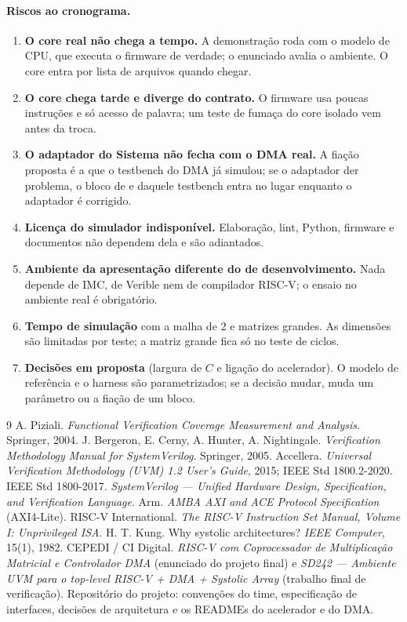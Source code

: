 \documentclass[10pt,a4paper]{article}
\newcommand{\code}[1]{\texttt{\detokenize{#1}}}
\begin{document}
\paragraph{Riscos ao cronograma.}
\begin{enumerate}[label=(\roman*),leftmargin=2.6em]
  \item \textbf{O core real não chega a tempo.} A demonstração roda com o modelo de CPU, que
  executa o firmware de verdade; o enunciado avalia o ambiente. O core entra por lista de arquivos
  quando chegar.
  \item \textbf{O core chega tarde e diverge do contrato.} O firmware usa poucas instruções e só
  acesso de palavra; um teste de fumaça do core isolado vem antes da troca.
  \item \textbf{O adaptador do Sistema não fecha com o DMA real.} A fiação proposta é a que o
  testbench do DMA já simulou; se o adaptador der problema, o bloco de \code{CTRL} e \code{STATUS}
  daquele testbench entra no lugar enquanto o adaptador é corrigido.
  \item \textbf{Licença do simulador indisponível.} Elaboração, lint, Python, firmware e documentos
  não dependem dela e são adiantados.
  \item \textbf{Ambiente da apresentação diferente do de desenvolvimento.} Nada depende de IMC, de
  Verible nem de compilador RISC-V; o ensaio no ambiente real é obrigatório.
  \item \textbf{Tempo de simulação} com a malha de 2 e matrizes grandes. As dimensões são limitadas
  por teste; a matriz grande fica só no teste de ciclos.
  \item \textbf{Decisões em proposta} (largura de $C$ e ligação do acelerador). O modelo de
  referência e o harness são parametrizados; se a decisão mudar, muda um parâmetro ou a fiação de
  um bloco.
\end{enumerate}

\begin{thebibliography}{9}
 A. Piziali. \emph{Functional Verification Coverage Measurement and Analysis}.
Springer, 2004.
 J. Bergeron, E. Cerny, A. Hunter, A. Nightingale. \emph{Verification Methodology
Manual for SystemVerilog}. Springer, 2005.
 Accellera. \emph{Universal Verification Methodology (UVM) 1.2 User's Guide}, 2015;
IEEE Std 1800.2-2020.
 IEEE Std 1800-2017. \emph{SystemVerilog --- Unified Hardware Design, Specification,
and Verification Language}.
 Arm. \emph{AMBA AXI and ACE Protocol Specification} (AXI4-Lite).
 RISC-V International. \emph{The RISC-V Instruction Set Manual, Volume I:
Unprivileged ISA}.
 H. T. Kung. Why systolic architectures? \emph{IEEE Computer}, 15(1), 1982.
 CEPEDI / CI Digital. \emph{RISC-V com Coprocessador de Multiplicação Matricial
e Controlador DMA} (enunciado do projeto final) e \emph{SD242 --- Ambiente UVM para o top-level
RISC-V + DMA + Systolic Array} (trabalho final de verificação).
 Repositório do projeto: convenções do time, especificação de interfaces, decisões de
arquitetura e os READMEs do acelerador e do DMA.
\end{thebibliography}
\end{document}
